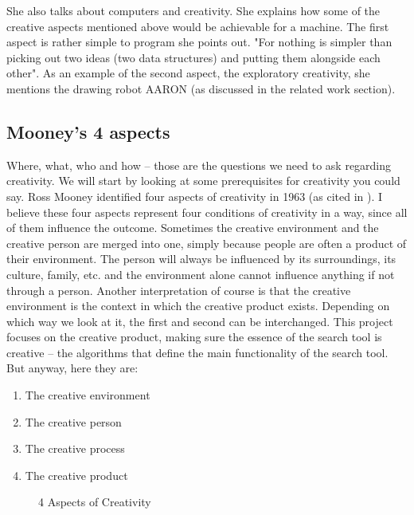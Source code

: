 She also talks about computers and creativity. She explains how some of the creative aspects mentioned above would be achievable for a machine.  The first aspect is rather simple to program she points out. "For nothing is simpler than picking out two ideas (two data structures) and putting them alongside each other". As an example of the second aspect, the exploratory creativity, she mentions the drawing robot AARON (as discussed in the related work section).

\subsection{Mooney's 4 aspects}

Where, what, who and how – those are the questions we need to ask regarding creativity. We will start by looking at some prerequisites for creativity you could say. Ross Mooney identified four aspects of creativity in 1963 (as cited in \citep{Sternberg1999}). I believe these four aspects represent four conditions of creativity in a way, since all of them influence the outcome. Sometimes the creative environment and the creative person are merged into one, simply because people are often a product of their environment. The person will always be influenced by its surroundings, its culture, family, etc. and the environment alone cannot influence anything if not through a person. Another interpretation of course is that the creative environment is the context in which the creative product exists. Depending on which way we look at it, the first and second can be interchanged. This project focuses on the creative product, making sure the essence of the search tool is creative – the algorithms that define the main functionality of the search tool. But anyway, here they are:

\begin{enumerate}
  \item The creative environment
  \item The creative person
  \item The creative process
  \item The creative product
\end{enumerate}

\begin{figure}[htb] %
  \centering
  \tikzset{every fit/.append style=text badly centered}
\caption[4 Aspects of Creativity]{4 Aspects of Creativity}
\label{fig:4Crea}
\end{figure}

